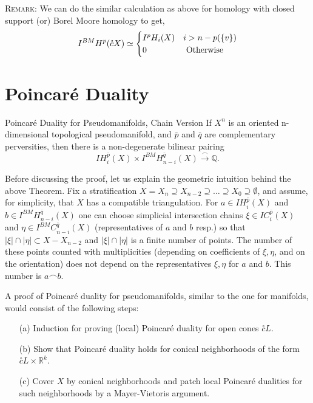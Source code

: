 \documentclass[11pt]{article}
\begin{document}
\noindent \textsc{Remark:} We can do the similar calculation as above for homology with closed support (or) Borel Moore homology to get,\[
    I^{BM}H^p(\mathring{c} X) \simeq \begin{cases}
        I^pH_i(X) & i > n -p(\qty{v})\\
        0 & \text{ Otherwise }
    \end{cases}      
\]

\section{Poincaré Duality}

\begin{Thm}{Poincaré Duality for Pseudomanifolds, Chain Version}{}
     If $X^n$ is an oriented n-dimensional topological pseudomanifold, and $\bar{p}$ and $\bar{q}$ are complementary perversities, then there is a non-degenerate bilinear pairing
$$
I H_i^{\bar{p}}(X) \times I^{B M} H_{n-i}^{\bar{q}}(X) \xrightarrow{\frown} \mathbb{Q} .
$$
\end{Thm}

Before discussing the proof, let us explain the geometric intuition behind the above Theorem. Fix a stratification $X=X_n \supseteq X_{n-2} \supseteq \ldots \supseteq X_0 \supseteq \emptyset$, and assume, for simplicity, that $X$ has a compatible triangulation. For $a \in I H_i^{\bar{p}}(X)$ and $b \in I^{B M} H_{n-i}^{\bar{q}}(X)$ one can choose simplicial intersection chains $\xi \in I C_i^{\bar{p}}(X)$ and $\eta \in I^{B M} C_{n-i}^{\bar{q}}(X)$ (representatives of $a$ and $b$ resp.) so that $|\xi| \cap|\eta| \subset X-X_{n-2}$ and $|\xi| \cap|\eta|$ is a finite number of points. The number of these points counted with multiplicities (depending on coefficients of $\xi, \eta$, and on the orientation) does not depend on the representatives $\xi, \eta$ for $a$ and $b$. This number is $a \frown b$.


\vspace*{0.2cm}

\noindent A proof of Poincaré duality for pseudomanifolds, similar to the one for manifolds, would consist of the following steps:
\begin{itemize}
\item[(a)] Induction for proving (local) Poincaré duality for open cones $\stackrel{\circ}{c} L$.
\item[(b)] Show that Poincaré duality holds for conical neighborhoods of the form $\stackrel{\circ}{c} L \times \mathbb{R}^k$.
\item[(c)] Cover $X$ by conical neighborhoods and patch local Poincaré dualities for such neighborhoods by a Mayer-Vietoris argument.
\end{itemize}
\end{document}
